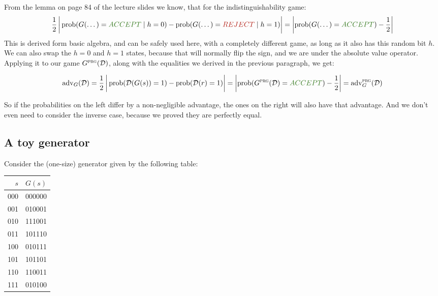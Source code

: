 \documentclass{article}
\begin{document}
  From the lemma on page 84 of the lecture slides we know, that for the indistinguishability game:
  \[ \frac{1}{2}\left|
    \vphantom{\frac{1}{2}}
    \operatorname{prob}(G(\dots) = \textcolor{OliveGreen}{ACCEPT} \mid h = 0) -
    \operatorname{prob}(G(\dots) = \textcolor{BrickRed}{REJECT} \mid h = 1)
  \right| = \left|
    \operatorname{prob}(G(\dots) = \textcolor{OliveGreen}{ACCEPT}) - \frac{1}{2}
  \right| \]
  This is derived form basic algebra, and can be safely used here, with a completely different game,
  as long as it also has this random bit $h$.
  We can also swap the $h=0$ and $h=1$ states, because that will normally flip the sign, and we are under the absolute value operator.
  Applying it to our game $G^\textsc{prg}(\mathcal{D})$, along with the equalities we derived in the previous paragraph, we get:

  \[ \operatorname{adv}_G(\mathcal{D}) = \frac{1}{2}\left|
    \vphantom{\frac{1}{2}}
    \operatorname{prob}(\mathcal{D}(G(s)) = 1) -
    \operatorname{prob}(\mathcal{D}(r) = 1)
  \right| = \left|
    \operatorname{prob}(G^\textsc{prg}(\mathcal{D}) = \textcolor{OliveGreen}{ACCEPT}) - \frac{1}{2}
  \right| = \operatorname{adv}^\textsc{prg}_G(\mathcal{D}) \]

  So if the probabilities on the left differ by a non-negligible advantage, the ones on the right will also have that advantage.
  And we don't even need to consider the inverse case, because we proved they are perfectly equal.

  \subsection{A toy generator}
  \begin{centerframebox}
    Consider the (one-size) generator given by the following table:

    \begin{center}
      \begin{tabular}{r|r}
        $s$ & $G(s)$ \\ \hline
        000 & 000000 \\
        001 & 010001 \\
        010 & 111001 \\
        011 & 101110 \\
        100 & 010111 \\
        101 & 101101 \\
        110 & 110011 \\
        111 & 010100 \\
      \end{tabular}
    \end{center}
  \end{centerframebox}
\end{document}
